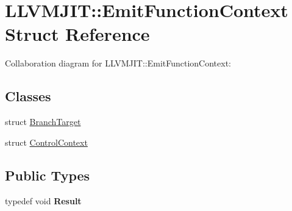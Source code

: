 \hypertarget{struct_l_l_v_m_j_i_t_1_1_emit_function_context}{}\section{L\+L\+V\+M\+J\+IT\+:\+:Emit\+Function\+Context Struct Reference}
\label{struct_l_l_v_m_j_i_t_1_1_emit_function_context}


Collaboration diagram for L\+L\+V\+M\+J\+IT\+:\+:Emit\+Function\+Context\+:
\subsection*{Classes}
\begin{DoxyCompactItemize}
\item 
struct \mbox{\hyperlink{struct_l_l_v_m_j_i_t_1_1_emit_function_context_1_1_branch_target}{Branch\+Target}}
\item 
struct \mbox{\hyperlink{struct_l_l_v_m_j_i_t_1_1_emit_function_context_1_1_control_context}{Control\+Context}}
\end{DoxyCompactItemize}
\subsection*{Public Types}
\begin{DoxyCompactItemize}
\item 
\mbox{\label{struct_l_l_v_m_j_i_t_1_1_emit_function_context_a97c3cbe8ee25238e19feebd45a9508ea}} 
typedef void {\bfseries Result}
\end{DoxyCompactItemize}
